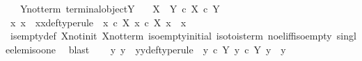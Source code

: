 \begin{isabellebody}
\ \ \ Y{\isacharunderscore}{\kern0pt}not{\isacharunderscore}{\kern0pt}term{\isacharcolon}{\kern0pt}\ {\isachardoublequoteopen}{\isasymnot}{\isacharparenleft}{\kern0pt}terminal{\isacharunderscore}{\kern0pt}object{\isacharparenleft}{\kern0pt}Y{\isacharparenright}{\kern0pt}{\isacharparenright}{\kern0pt}{\isachardoublequoteclose}\isanewline
\ \ \ {\isachardoublequoteopen}{\isacharparenleft}{\kern0pt}X\ {\isasymCoprod}\ Y{\isacharparenright}{\kern0pt}\ {\isasymle}\isactrlsub c\ {\isacharparenleft}{\kern0pt}X\ {\isasymtimes}\isactrlsub c\ Y{\isacharparenright}{\kern0pt}{\isachardoublequoteclose}\isanewline
%
\isadelimproof
%
\endisadelimproof
%
\isatagproof
{}\isamarkupfalse%
\ {\isacharminus}{\kern0pt}\ \isanewline
\ \ \isamarkupfalse%
\ x{}\ x{}\ \ x{}x{}{\isacharunderscore}{\kern0pt}def{\isacharbrackleft}{\kern0pt}type{\isacharunderscore}{\kern0pt}rule{\isacharbrackright}{\kern0pt}{\isacharcolon}{\kern0pt}\ \ {\isachardoublequoteopen}{\isacharparenleft}{\kern0pt}x{}\ {\isasymin}\isactrlsub c\ X{\isacharparenright}{\kern0pt}{\isachardoublequoteclose}\ {\isachardoublequoteopen}{\isacharparenleft}{\kern0pt}x{}\ {\isasymin}\isactrlsub c\ X{\isacharparenright}{\kern0pt}{\isachardoublequoteclose}\ {\isachardoublequoteopen}{\isacharparenleft}{\kern0pt}x{}\ {\isasymnoteq}\ x{}{\isacharparenright}{\kern0pt}{\isachardoublequoteclose}\isanewline
\ \ \ \ \isamarkupfalse%
\ is{\isacharunderscore}{\kern0pt}empty{\isacharunderscore}{\kern0pt}def\ X{\isacharunderscore}{\kern0pt}not{\isacharunderscore}{\kern0pt}init\ X{\isacharunderscore}{\kern0pt}not{\isacharunderscore}{\kern0pt}term\ iso{\isacharunderscore}{\kern0pt}empty{\isacharunderscore}{\kern0pt}initial\ iso{\isacharunderscore}{\kern0pt}to{}{\isacharunderscore}{\kern0pt}is{\isacharunderscore}{\kern0pt}term\ no{\isacharunderscore}{\kern0pt}el{\isacharunderscore}{\kern0pt}iff{\isacharunderscore}{\kern0pt}iso{\isacharunderscore}{\kern0pt}empty\ single{\isacharunderscore}{\kern0pt}elem{\isacharunderscore}{\kern0pt}iso{\isacharunderscore}{\kern0pt}one\ \isamarkupfalse%
\ blast\isanewline
\ \ \isamarkupfalse%
\ y{}\ y{}\ \ y{}y{}{\isacharunderscore}{\kern0pt}def{\isacharbrackleft}{\kern0pt}type{\isacharunderscore}{\kern0pt}rule{\isacharbrackright}{\kern0pt}{\isacharcolon}{\kern0pt}\ \ {\isachardoublequoteopen}{\isacharparenleft}{\kern0pt}y{}\ {\isasymin}\isactrlsub c\ Y{\isacharparenright}{\kern0pt}{\isachardoublequoteclose}\ {\isachardoublequoteopen}{\isacharparenleft}{\kern0pt}y{}\ {\isasymin}\isactrlsub c\ Y{\isacharparenright}{\kern0pt}{\isachardoublequoteclose}\ {\isachardoublequoteopen}{\isacharparenleft}{\kern0pt}y{}\ {\isasymnoteq}\ y{}{\isacharparenright}{\kern0pt}{\isachardoublequoteclose}\isanewline

\end{isabellebody}

